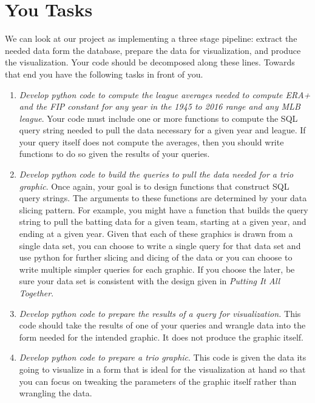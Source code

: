 \documentclass[10pt]{article}
\begin{document}
\section*{You Tasks}

We can look at our project as implementing a three stage pipeline: extract the needed data form the database, prepare the data for visualization, and produce the visualization. Your code should be decomposed along these lines. Towards that end you have the following tasks in front of you.
\begin{enumerate}
  \item \textit{Develop python code to compute the league averages needed to compute ERA+ and the FIP constant for any year in the 1945 to 2016 range and any MLB league}. Your code must include one or more functions to compute the SQL query string needed to pull the data necessary for a given year and league. If your query itself does not compute the averages, then you should write functions to do so given the results of your queries.

  \item \textit{Develop python code to build the queries to pull the data needed for a trio graphic}. Once again, your goal is to design functions that construct SQL query strings. The arguments to these functions are determined by your data slicing pattern. For example, you might have a function that builds the query string to pull the batting data for a given team, starting at a given year, and ending at a given year. Given that each of these graphics is drawn from a single data set, you can choose to write a single query for that data set and use python for further slicing and dicing of the data or you can choose to write multiple simpler queries for each graphic. If you choose the later, be sure your data set is consistent with the design given in \textit{Putting It All Together}.

  \item \textit{Develop python code to prepare the results of a query for visualization.} This code should take the results of one of your queries and wrangle data into the form needed for the intended graphic. It does not produce the graphic itself.

  \item \textit{Develop python code to prepare a trio graphic}. This code is given the data its going to visualize in a form that is ideal for the visualization at hand so that you can focus on tweaking the parameters of the graphic itself rather than wrangling the data.
\end{enumerate}
\end{document}
